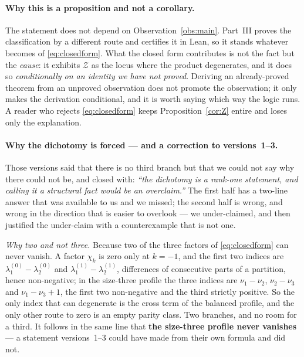 \documentclass[11pt,a4paper]{article}
\begin{document}
\paragraph{Why this is a proposition and not a corollary.} The statement does not depend on
Observation~\ref{obs:main}. Part~III proves the classification by a different route and
certifies it in Lean, so it stands whatever becomes of \eqref{eq:closedform}. What the closed
form contributes is not the fact but the \emph{cause}: it exhibits $\mathcal Z$ as the locus
where the product degenerates, and it does so \emph{conditionally on an identity we have not
proved}. Deriving an already-proved theorem from an unproved observation does not promote the
observation; it only makes the derivation conditional, and it is worth saying which way the
logic runs. A reader who rejects \eqref{eq:closedform} keeps Proposition~\ref{cor:Z} entire and
loses only the explanation.

\paragraph{Why the dichotomy is forced --- and a correction to versions~1--3.} Those versions
said that there is no third branch but that we could not say why there could not be, and closed
with: \emph{``the dichotomy is a rank-one statement, and calling it a structural fact would be an
overclaim.''} The first half has a two-line answer that was available to us and we missed; the
second half is wrong, and wrong in the direction that is easier to overlook --- we under-claimed,
and then justified the under-claim with a counterexample that is not one.

\emph{Why two and not three.} Because two of the three factors of \eqref{eq:closedform} can never
vanish. A factor $\chi_k$ is zero only at $k=-1$, and the first two indices are
$\lambda^{(0)}_1-\lambda^{(0)}_2$ and $\lambda^{(1)}_1-\lambda^{(1)}_2$, differences of consecutive
parts of a partition, hence non-negative; in the size-three profile the three indices are
$\nu_1-\nu_2$, $\nu_2-\nu_3$ and $\nu_1-\nu_3+1$, the first two non-negative and the third
strictly positive. So the only index that can degenerate is the cross term of the balanced
profile, and the only other route to zero is an empty parity class. Two branches, and no room for
a third. It follows in the same line that \textbf{the size-three profile never vanishes} --- a
statement versions~1--3 could have made from their own formula and did not.
\end{document}
